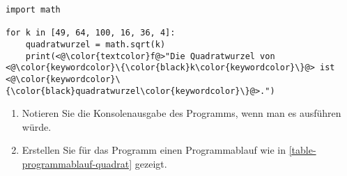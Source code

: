 \begin{lstlisting}[caption={Das Programm berechnet die Quadratwurzeln der vorgegebenen Zahlen.}, label={lst-programmablauf-quadratwurzeln}]
import math

for k in [49, 64, 100, 16, 36, 4]:
    quadratwurzel = math.sqrt(k)
    print(<@\color{textcolor}f@>"Die Quadratwurzel von <@\color{keywordcolor}\{\color{black}k\color{keywordcolor}\}@> ist <@\color{keywordcolor}\{\color{black}quadratwurzel\color{keywordcolor}\}@>.")
\end{lstlisting}

\begin{enumerate}
\item Notieren Sie die Konsolenausgabe des Programms, wenn man es ausführen würde.

\fillwithgrid{2.5in}

\item Erstellen Sie für das Programm einen Programmablauf wie in \autoref{table-programmablauf-quadrat} gezeigt.

\end{enumerate}

